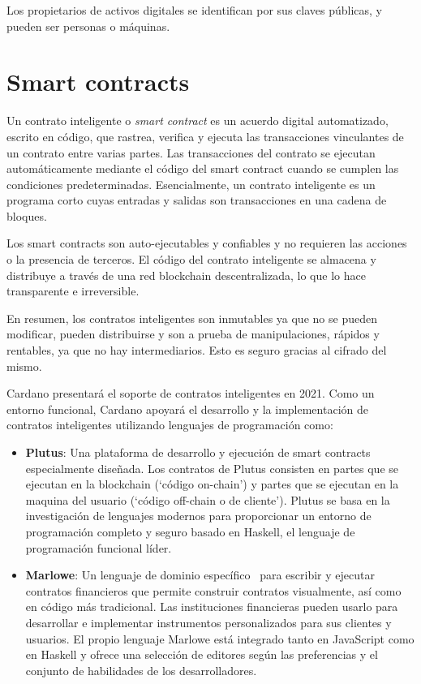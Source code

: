 \documentclass[12pt]{book}
\begin{document}
Los propietarios de activos digitales se identifican por sus claves públicas, y pueden ser personas o máquinas.

\section{Smart contracts}

Un contrato inteligente o \textit{smart contract} es un acuerdo digital automatizado, escrito en código, que rastrea, verifica y ejecuta las transacciones vinculantes de un contrato entre varias partes. Las transacciones del contrato se ejecutan automáticamente mediante el código del smart contract cuando se cumplen las condiciones predeterminadas. Esencialmente, un contrato inteligente es un programa corto cuyas entradas y salidas son transacciones en una cadena de bloques.

Los smart contracts son auto-ejecutables y confiables y no requieren las acciones o la presencia de terceros. El código del contrato inteligente se almacena y distribuye a través de una red blockchain descentralizada, lo que lo hace transparente e irreversible.

En resumen, los contratos inteligentes son inmutables ya que no se pueden modificar, pueden distribuirse y son a prueba de manipulaciones, rápidos y rentables, ya que no hay intermediarios. Esto es seguro gracias al cifrado del mismo.

Cardano presentará el soporte de contratos inteligentes en 2021. Como un entorno funcional, Cardano apoyará el desarrollo y la implementación de contratos inteligentes utilizando lenguajes de programación como:

\begin{itemize}
	\item \textbf{Plutus}: Una plataforma de desarrollo y ejecución de smart contracts especialmente diseñada.
	      Los contratos de Plutus consisten en partes que se ejecutan en la blockchain (`código on-chain') y partes que se ejecutan en la maquina del usuario (`código off-chain o de cliente').
	      Plutus se basa en la investigación de lenguajes modernos para proporcionar un entorno de programación completo y seguro basado en Haskell, el lenguaje de programación funcional líder.

	\item \textbf{Marlowe}: Un lenguaje de dominio específico~\cite{fowler2010dsl} para escribir y ejecutar contratos financieros que permite construir contratos visualmente, así como en código más tradicional. Las instituciones financieras pueden usarlo para desarrollar e implementar instrumentos personalizados para sus clientes y usuarios. El propio lenguaje Marlowe está integrado tanto en JavaScript como en Haskell y ofrece una selección de editores según las preferencias y el conjunto de habilidades de los desarrolladores.
\end{itemize}
\end{document}

